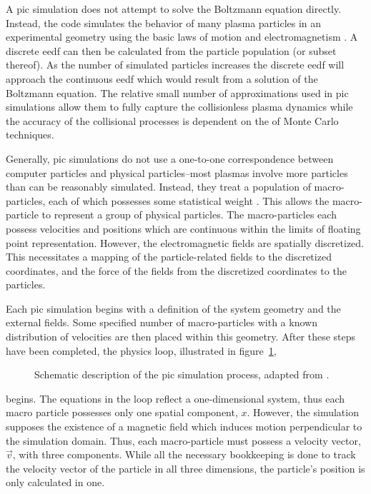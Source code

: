 A \acs{pic} simulation does not attempt to solve the Boltzmann equation
directly. Instead, the code simulates the behavior of many plasma particles in
an experimental geometry using the basic laws of motion and electromagnetism
\cite{Birdsall1991}. A discrete \acs{eedf} can then be calculated from the
particle population (or subset thereof). As the number of simulated particles
increases the discrete \acs{eedf} will approach the continuous \acs{eedf} which
would result from a solution of the Boltzmann equation. The relative small
number of approximations used in \acs{pic} simulations allow them to fully
capture the collisionless plasma dynamics \cite{Pritchett2003} while the
accuracy of the collisional processes is dependent on the of Monte Carlo
techniques.

Generally, \acs{pic} simulations do not use a one-to-one correspondence between
computer particles and physical particles--most plasmas involve more particles
than can be reasonably simulated. Instead, they treat a population of
macro-particles, each of which possesses some statistical weight
\cite{Birdsall1991}. This allows the macro-particle to represent a group of
physical particles. The macro-particles each possess velocities and positions
which are continuous within the limits of floating point representation.
However, the electromagnetic fields are spatially discretized. This necessitates
a mapping of the particle-related fields to the discretized coordinates, and the
force of the fields from the discretized coordinates to the particles.

Each \acs{pic} simulation begins with a definition of the system geometry and
the external fields. Some specified number of macro-particles with a known
distribution of velocities are then placed within this geometry. After these
steps have been completed, the physics loop, illustrated in
figure~\ref{fig:pic},
\begin{figure}
  \centering
  
  \caption{Schematic description of the \acs{pic} simulation process, adapted
    from \cite{Birdsall1991}.}
  \label{fig:pic}
\end{figure}
begins. The equations in the loop reflect a one-dimensional system, thus each
macro particle possesses only one spatial component, $x$. However, the
simulation supposes the existence of a magnetic field which induces motion
perpendicular to the simulation domain. Thus, each macro-particle must possess a
velocity vector, $\vec{v}$, with three components. While all the necessary
bookkeeping is done to track the velocity vector of the particle in all three
dimensions, the particle's position is only calculated in one.

